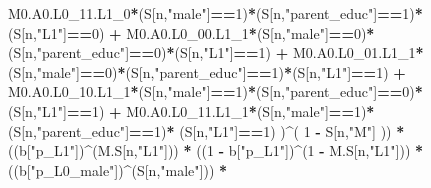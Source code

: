 \documentclass[
]{book}
\newenvironment{Shaded}{\begin{snugshade}}{\end{snugshade}}
\newcommand{\DecValTok}[1]{\textcolor[rgb]{0.00,0.00,0.81}{#1}}
\newcommand{\NormalTok}[1]{#1}
\newcommand{\SpecialCharTok}[1]{\textcolor[rgb]{0.81,0.36,0.00}{\textbf{#1}}}
\newcommand{\StringTok}[1]{\textcolor[rgb]{0.31,0.60,0.02}{#1}}
\begin{document}
\begin{Shaded}
\begin{Highlighting}[]
\NormalTok{          M0.A0.L0\_11.L1\_0}\SpecialCharTok{*}\NormalTok{(S[n,}\StringTok{"male"}\NormalTok{]}\SpecialCharTok{==}\DecValTok{1}\NormalTok{)}\SpecialCharTok{*}\NormalTok{(S[n,}\StringTok{"parent\_educ"}\NormalTok{]}\SpecialCharTok{==}\DecValTok{1}\NormalTok{)}\SpecialCharTok{*}\NormalTok{(S[n,}\StringTok{"L1"}\NormalTok{]}\SpecialCharTok{==}\DecValTok{0}\NormalTok{) }\SpecialCharTok{+}
\NormalTok{          M0.A0.L0\_00.L1\_1}\SpecialCharTok{*}\NormalTok{(S[n,}\StringTok{"male"}\NormalTok{]}\SpecialCharTok{==}\DecValTok{0}\NormalTok{)}\SpecialCharTok{*}\NormalTok{(S[n,}\StringTok{"parent\_educ"}\NormalTok{]}\SpecialCharTok{==}\DecValTok{0}\NormalTok{)}\SpecialCharTok{*}\NormalTok{(S[n,}\StringTok{"L1"}\NormalTok{]}\SpecialCharTok{==}\DecValTok{1}\NormalTok{) }\SpecialCharTok{+}
\NormalTok{          M0.A0.L0\_01.L1\_1}\SpecialCharTok{*}\NormalTok{(S[n,}\StringTok{"male"}\NormalTok{]}\SpecialCharTok{==}\DecValTok{0}\NormalTok{)}\SpecialCharTok{*}\NormalTok{(S[n,}\StringTok{"parent\_educ"}\NormalTok{]}\SpecialCharTok{==}\DecValTok{1}\NormalTok{)}\SpecialCharTok{*}\NormalTok{(S[n,}\StringTok{"L1"}\NormalTok{]}\SpecialCharTok{==}\DecValTok{1}\NormalTok{) }\SpecialCharTok{+}
\NormalTok{          M0.A0.L0\_10.L1\_1}\SpecialCharTok{*}\NormalTok{(S[n,}\StringTok{"male"}\NormalTok{]}\SpecialCharTok{==}\DecValTok{1}\NormalTok{)}\SpecialCharTok{*}\NormalTok{(S[n,}\StringTok{"parent\_educ"}\NormalTok{]}\SpecialCharTok{==}\DecValTok{0}\NormalTok{)}\SpecialCharTok{*}\NormalTok{(S[n,}\StringTok{"L1"}\NormalTok{]}\SpecialCharTok{==}\DecValTok{1}\NormalTok{) }\SpecialCharTok{+}
\NormalTok{          M0.A0.L0\_11.L1\_1}\SpecialCharTok{*}\NormalTok{(S[n,}\StringTok{"male"}\NormalTok{]}\SpecialCharTok{==}\DecValTok{1}\NormalTok{)}\SpecialCharTok{*}\NormalTok{(S[n,}\StringTok{"parent\_educ"}\NormalTok{]}\SpecialCharTok{==}\DecValTok{1}\NormalTok{)}\SpecialCharTok{*}
\NormalTok{          (S[n,}\StringTok{"L1"}\NormalTok{]}\SpecialCharTok{==}\DecValTok{1}\NormalTok{) )}\SpecialCharTok{\^{}}\NormalTok{( }\DecValTok{1} \SpecialCharTok{{-}}\NormalTok{ S[n,}\StringTok{"M"}\NormalTok{] )) }\SpecialCharTok{*}
\NormalTok{      ((b[}\StringTok{"p\_L1"}\NormalTok{])}\SpecialCharTok{\^{}}\NormalTok{(M.S[n,}\StringTok{"L1"}\NormalTok{])) }\SpecialCharTok{*}
\NormalTok{      ((}\DecValTok{1} \SpecialCharTok{{-}}\NormalTok{ b[}\StringTok{"p\_L1"}\NormalTok{])}\SpecialCharTok{\^{}}\NormalTok{(}\DecValTok{1} \SpecialCharTok{{-}}\NormalTok{ M.S[n,}\StringTok{"L1"}\NormalTok{])) }\SpecialCharTok{*}
\NormalTok{      ((b[}\StringTok{"p\_L0\_male"}\NormalTok{])}\SpecialCharTok{\^{}}\NormalTok{(S[n,}\StringTok{"male"}\NormalTok{])) }\SpecialCharTok{*} 

\end{Highlighting}
\end{Shaded}
\end{document}
